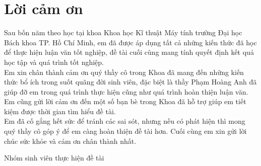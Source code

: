 \chapter*{Lời cảm ơn}
\onehalfspacing
\vspace{1.0cm}
Sau bốn năm theo học tại khoa Khoa học Kĩ thuật Máy tính trường Đại học Bách khoa TP. Hồ Chí Minh, em đã được áp dụng tất cả những kiến thức đã học để thực hiện luận văn tốt nghiệp, đề tài cuối cùng mang tính quyết định kết quả học tập và quá trình tốt nghiệp.\\

Em xin chân thành cảm ơn quý thầy cô trong Khoa đã mang đến những kiến thức bổ ích trong suốt quãng đời sinh viên, đặc biệt là thầy Phạm Hoàng Anh đã giúp đỡ em trong quá trình thực hiện cũng như quá trình hoàn thiện luận văn. Em cũng gửi lời cảm ơn đến một số bạn bè trong Khoa đã hỗ trợ giúp em tiết kiệm được thời gian tìm hiểu đề tài. \\

Em đã cố gắng hết sức để tránh các sai sót, nhưng nếu có phát hiện thì mong quý thầy cô góp ý để em càng hoàn thiện đề tài hơn. Cuối cùng em xin gửi lời chúc sức khỏe và cảm ơn chân thành nhất.
\begin{flushright}
 Nhóm sinh viên thực hiện đề tài 
\end{flushright}

\bigskip
 
